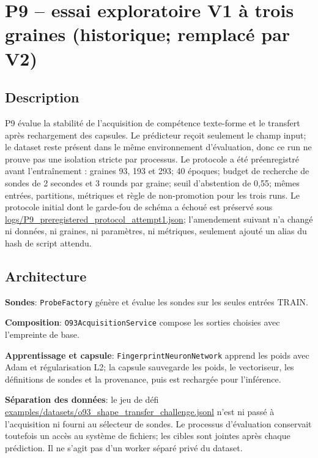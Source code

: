 \documentclass[11pt,a4paper,oneside]{report}
\begin{document}
\chapter{P9 -- essai exploratoire V1 à trois graines (historique; remplacé par V2)}

\section{Description}
P9 évalue la stabilité de l'acquisition de compétence texte-forme et le transfert après rechargement des capsules. Le prédicteur reçoit seulement le champ input; le dataset reste présent dans le même environnement d'évaluation, donc ce run ne prouve pas une isolation stricte par processus. Le protocole a été préenregistré avant l'entraînement : graines 93, 193 et 293; 40 époques; budget de recherche de sondes de 2 secondes et 3 rounds par graine; seuil d'abstention de 0,55; mêmes entrées, partitions, métriques et règle de non-promotion pour les trois runs. Le protocole initial dont le garde-fou de schéma a échoué est préservé sous \url{logs/P9_preregistered_protocol_attempt1.json}; l'amendement suivant n'a changé ni données, ni graines, ni paramètres, ni métriques, seulement ajouté un alias du hash de script attendu.

\section{Architecture}
\textbf{Sondes}: \texttt{ProbeFactory} génère et évalue les sondes sur les seules entrées TRAIN.

\textbf{Composition}: \texttt{O93AcquisitionService} compose les sorties choisies avec l’empreinte de base.

\textbf{Apprentissage et capsule}: \texttt{FingerprintNeuronNetwork} apprend les poids avec Adam et régularisation L2; la capsule sauvegarde les poids, le vectoriseur, les définitions de sondes et la provenance, puis est rechargée pour l’inférence.

\textbf{Séparation des données}: le jeu de défi \url{examples/datasets/o93_shape_transfer_challenge.jsonl} n'est ni passé à l'acquisition ni fourni au sélecteur de sondes. Le processus d'évaluation conservait toutefois un accès au système de fichiers; les cibles sont jointes après chaque prédiction. Il ne s'agit pas d'un worker séparé privé du dataset.
\end{document}
